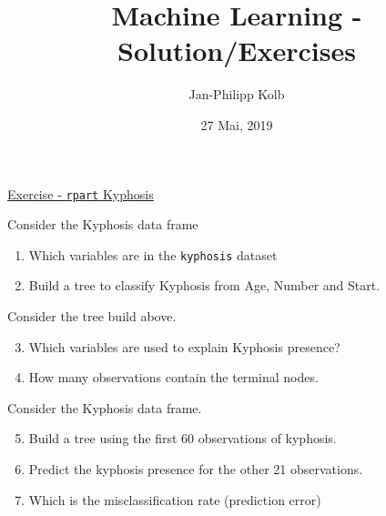 \documentclass[
  10pt,
  ignorenonframetext,
]{beamer}
\title{Machine Learning - Solution/Exercises}
\author{Jan-Philipp Kolb}
\date{27 Mai, 2019}
\providecommand{\tightlist}{%
  \setlength{\itemsep}{0pt}\setlength{\parskip}{0pt}}
\begin{document}
\frame{\titlepage}

\begin{frame}[fragile]{\href{https://www.r-exercises.com/2016/12/13/recursive-partitioning-and-regression-trees-exercises/}{Exercise
- \texttt{rpart} Kyphosis}}
\protect\hypertarget{exercise---rpart-kyphosis}{}

\begin{block}{Consider the Kyphosis data frame}

\begin{enumerate}
[1)]
\tightlist
\item
  Which variables are in the \texttt{kyphosis} dataset
\item
  Build a tree to classify Kyphosis from Age, Number and Start.
\end{enumerate}

\end{block}

\begin{block}{Consider the tree build above.}

\begin{enumerate}
[1)]
\setcounter{enumi}{2}
\tightlist
\item
  Which variables are used to explain Kyphosis presence?
\item
  How many observations contain the terminal nodes.
\end{enumerate}

\end{block}

\begin{block}{Consider the Kyphosis data frame.}

\begin{enumerate}
[1)]
\setcounter{enumi}{4}
\tightlist
\item
  Build a tree using the first 60 observations of kyphosis.
\item
  Predict the kyphosis presence for the other 21 observations.
\item
  Which is the misclassification rate (prediction error)
\end{enumerate}

\end{block}

\end{frame}
\end{document}
